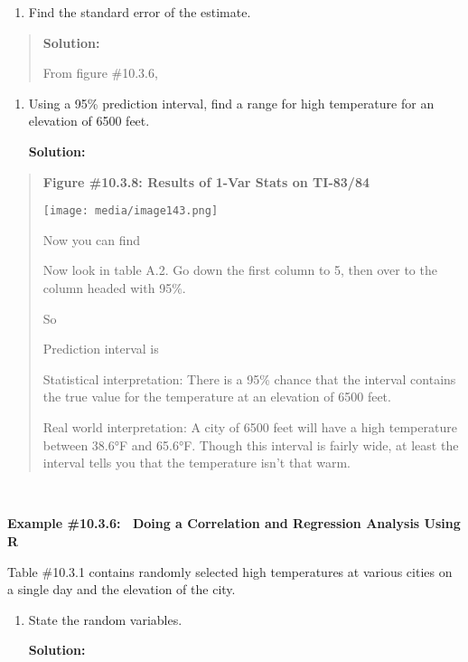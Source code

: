 \documentclass[]{book}
\providecommand{\tightlist}{%
  \setlength{\itemsep}{0pt}\setlength{\parskip}{0pt}}
\begin{document}
\begin{enumerate}
\def\labelenumi{\roman{enumi}.}
\tightlist
\item
  Find the standard error of the estimate.
\end{enumerate}

\begin{quote}
\textbf{Solution:}

From figure \#10.3.6,
\end{quote}

\begin{enumerate}
\def\labelenumi{\alph{enumi}.}
\setcounter{enumi}{9}
\item
  Using a 95\% prediction interval, find a range for high temperature
  for an elevation of 6500 feet.

  \textbf{Solution:}
\end{enumerate}

\begin{quote}
\textbf{Figure \#10.3.8: Results of 1-Var Stats on TI-83/84}

\texttt{[image: media/image143.png]}

Now you can find

Now look in table A.2. Go down the first column to 5, then over to the
column headed with 95\%.

So

Prediction interval is

Statistical interpretation: There is a 95\% chance that the interval
contains the true value for the temperature at an elevation of 6500
feet.

Real world interpretation: A city of 6500 feet will have a high
temperature between 38.6°F and 65.6°F. Though this interval is fairly
wide, at least the interval tells you that the temperature isn't that
warm.
\end{quote}

\textbf{\\
}

\textbf{Example \#10.3.6:~ Doing a Correlation and Regression Analysis Using
R}

Table \#10.3.1 contains randomly selected high temperatures at various
cities on a single day and the elevation of the city.

\begin{enumerate}
\def\labelenumi{\alph{enumi}.}
\item
  State the random variables.

  \textbf{Solution:}
\end{enumerate}
\end{document}
